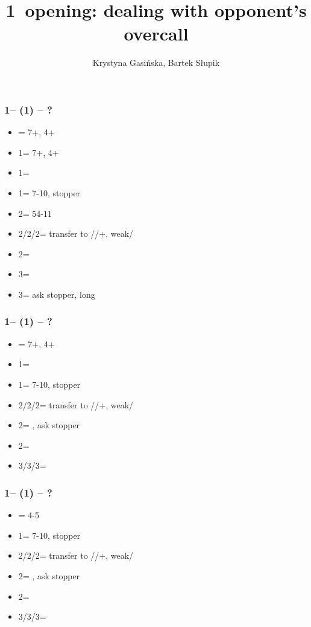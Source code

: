 \documentclass[12pt, a4paper]{article}
\title{1\clubs\ opening: dealing with opponent's overcall}
\author{Krystyna Gasińska, Bartek Słupik}
\begin{document}
\maketitle


\subsubsection*{1\clubs -- (1\diams) -- ?}
\begin{itemize}
    \item \dbl = 7+, 4+\hearts
    \item 1\hearts = 7+, 4+\spades
    \item 1\spades = \nt
    \item 1\nt = 7-10, \diams stopper
    \item 2\clubs = 54-11
    \item 2\diams/2\hearts/2\spades = transfer to \hearts/\spades/+, weak/\gf
    \item 2\nt = \inv
    \item 3\clubs = \inv
    \item 3\diams = ask stopper, long \clubs
\end{itemize}

\subsubsection*{1\clubs -- (1\hearts) -- ?}
\begin{itemize}
    \item \dbl = 7+, 4+\spades
    \item 1\spades = \nt
    \item 1\nt = 7-10, \hearts stopper
    \item 2\clubs/2\hearts/2\spades = transfer to \diams/\spades/+, weak/\gf
    \item 2\diams = \invp, ask stopper
    \item 2\nt = \inv
    \item 3\clubs/3\diams/3\spades = \inv
\end{itemize}

\subsubsection*{1\clubs -- (1\spades) -- ?}
\begin{itemize}
    \item \dbl = 4-5\hearts
    \item 1\nt = 7-10, \spades stopper
    \item 2\clubs/2\diams/2\spades = transfer to \diams/\hearts/+, weak/\gf
    \item 2\hearts = \gf, ask stopper
    \item 2\nt = \inv
    \item 3\clubs/3\diams/3\hearts = \inv
\end{itemize}
\end{document}
